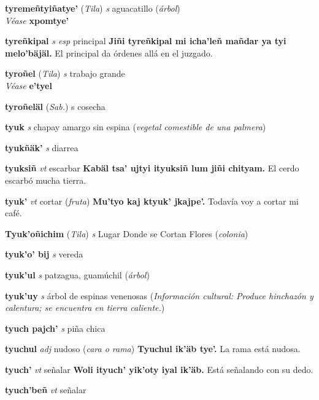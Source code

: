 \documentclass[10pt]{scrbook}
\newcommand{\entry}[1]{\textbf{#1}}
\newcommand{\partofspeech}[1]{\textit{#1}}
\newcommand{\spanishtranslation}[1]{#1}
\newcommand{\clarification}[1]{(\textit{#1})}
\newcommand{\cholexample}[1]{\textbf{#1}}
\newcommand{\exampletranslation}[1]{#1}
\newcommand{\alsosee}[1]{\\\textit{Véase} \textbf{#1}}
\newcommand{\relevantdialect}[1]{(\textit{#1})}
\newcommand{\culturalinformation}[1]{(\textit{#1})}
\begin{document}
\begin{multicols}{2}
\entry{tyremeñtyiñatye'}
\relevantdialect{Tila}
\partofspeech{s}
\spanishtranslation{aguacatillo}
\clarification{árbol}
\alsosee{xpomtye'}

\entry{tyreñkipal}
\partofspeech{s esp}
\spanishtranslation{principal}
\cholexample{Jiñi tyreñkipal mi icha'leñ mañdar ya tyi melo'bäjäl.}
\exampletranslation{El principal da órdenes allá en el juzgado.}

\entry{tyroñel}
\relevantdialect{Tila}
\partofspeech{s}
\spanishtranslation{trabajo grande}
\alsosee{e'tyel}

\entry{tyroñeläl}
\relevantdialect{Sab.}
\spanishtranslation{s cosecha}

\entry{tyuk}
\partofspeech{s}
\spanishtranslation{chapay amargo sin espina}
\clarification{vegetal comestible de una palmera}

\entry{tyukñäk'}
\partofspeech{s}
\spanishtranslation{diarrea}

\entry{tyuksiñ}
\partofspeech{vt}
\spanishtranslation{escarbar}
\cholexample{Kabäl tsa' ujtyi ityuksiñ lum jiñi chityam.}
\exampletranslation{El cerdo escarbó mucha tierra.}

\entry{tyuk'}
\partofspeech{vt}
\spanishtranslation{cortar}
\clarification{fruta}
\cholexample{Mu'tyo kaj ktyuk' jkajpe'.}
\exampletranslation{Todavía voy a cortar mi café.}

\entry{Tyuk'oñichim}
\relevantdialect{Tila}
\partofspeech{s}
\spanishtranslation{Lugar Donde se Cortan Flores}
\clarification{colonia}

\entry{tyuk'o' bij}
\partofspeech{s}
\spanishtranslation{vereda}

\entry{tyuk'ul}
\partofspeech{s}
\spanishtranslation{patzagua, guamúchil}
\clarification{árbol}

\entry{tyuk'uy}
\partofspeech{s}
\spanishtranslation{árbol de espinas venenosas}
\culturalinformation{Información cultural: Produce hinchazón y calentura; se encuentra en tierra caliente.}

\entry{tyuch pajch'}
\partofspeech{s}
\spanishtranslation{piña chica}

\entry{tyuchul}
\partofspeech{adj}
\spanishtranslation{nudoso}
\clarification{cara o rama}
\cholexample{Tyuchul ik'äb tye'.}
\exampletranslation{La rama está nudosa.}

\entry{tyuch'}
\partofspeech{vt}
\spanishtranslation{señalar}
\cholexample{Woli ityuch' yik'oty iyal ik'äb.}
\exampletranslation{Está señalando con su dedo.}

\entry{tyuch'beñ}
\partofspeech{vt}
\spanishtranslation{señalar}


\end{multicols}
\end{document}
